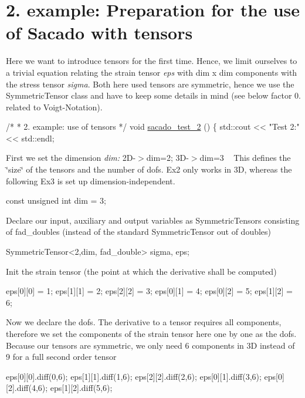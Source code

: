  \hypertarget{index_Ex2}{}\section{2. example\+: Preparation for the use of Sacado with tensors}\label{index_Ex2}
Here we want to introduce tensors for the first time. Hence, we limit ourselves to a trivial equation relating the strain tensor {\itshape eps} with dim x dim components with the stress tensor {\itshape sigma}. Both here used tensors are symmetric, hence we use the Symmetric\+Tensor class and have to keep some details in mind (see below factor 0. related to Voigt-\/\+Notation). 
\begin{DoxyCode}
\textcolor{comment}{/*}
\textcolor{comment}{ * 2. example: use of tensors}
\textcolor{comment}{ */}
\textcolor{keywordtype}{void} \hyperlink{Sacado__example_8cc_a8ef4ff1e9526ca8451cdcd1678366d2c}{sacado\_test\_2} ()
\{
    std::cout << \textcolor{stringliteral}{"Test 2:"} << std::endl;
\end{DoxyCode}
 First we set the dimension {\itshape dim\+:} 2\+D-\/$>$dim=2; 3\+D-\/$>$dim=3 ~\newline
 This defines the \char`\"{}size\char`\"{} of the tensors and the number of dofs. Ex2 only works in 3D, whereas the following Ex3 is set up dimension-\/independent. 
\begin{DoxyCode}
\textcolor{keyword}{const} \textcolor{keywordtype}{unsigned} \textcolor{keywordtype}{int} dim = 3;
\end{DoxyCode}
 Declare our input, auxiliary and output variables as Symmetric\+Tensors consisting of fad\+\_\+doubles (instead of the standard Symmetric\+Tensor out of doubles) 
\begin{DoxyCode}
SymmetricTensor<2,dim, fad\_double> sigma, eps;
\end{DoxyCode}
 Init the strain tensor (the point at which the derivative shall be computed) 
\begin{DoxyCode}
eps[0][0] = 1;
eps[1][1] = 2;
eps[2][2] = 3;
eps[0][1] = 4;
eps[0][2] = 5;
eps[1][2] = 6;
\end{DoxyCode}
 Now we declare the dofs. The derivative to a tensor requires all components, therefore we set the components of the strain tensor here one by one as the dofs. Because our tensors are symmetric, we only need 6 components in 3D instead of 9 for a full second order tensor 
\begin{DoxyCode}
eps[0][0].diff(0,6);
eps[1][1].diff(1,6);
eps[2][2].diff(2,6);
eps[0][1].diff(3,6);
eps[0][2].diff(4,6);
eps[1][2].diff(5,6);
\end{DoxyCode}
